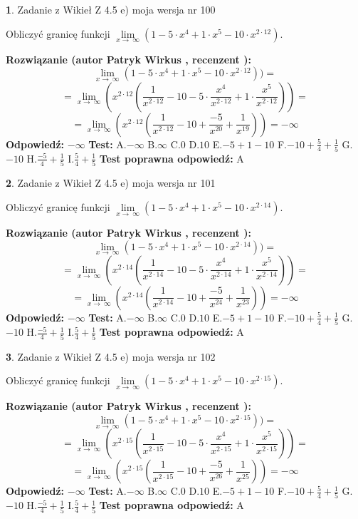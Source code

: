 \documentclass[12pt, a4paper]{article}
\theoremstyle{definition} %
\newtheorem{zad}{}
\newcommand{\zadStart}[1]{\begin{zad}#1\newline}
\newcommand{\zadStop}{\end{zad}}
\newcommand{\rozwStart}[2]{\noindent \textbf{Rozwiązanie (autor #1 , recenzent #2): }\newline}
\newcommand{\rozwStop}{\newline}
\newcommand{\odpStart}{\noindent \textbf{Odpowiedź:}\newline}
\newcommand{\odpStop}{\newline}
\newcommand{\testStart}{\noindent \textbf{Test:}\newline}
\newcommand{\testStop}{\newline}
\newcommand{\kluczStart}{\noindent \textbf{Test poprawna odpowiedź:}\newline}
\newcommand{\kluczStop}{\newline}
\begin{document}
\zadStart{Zadanie z Wikieł Z 4.5 e) moja wersja nr 100}



Obliczyć granicę funkcji  $\lim\limits_{x\to\ \infty}(1 - 5 \cdot x^{4}+1 \cdot x^{5}- 10 \cdot x^{2\cdot12})$.
\zadStop
\rozwStart{Patryk Wirkus}{}
$$\lim\limits_{x\to\ \infty}(1 - 5 \cdot x^{4}+1 \cdot x^{5}- 10 \cdot x^{2\cdot12}))=$$
$$=\lim\limits_{x\to\ \infty}(x^{2\cdot12}(\frac{1}{x^{2\cdot12}}-10 -5 \cdot \frac{x^{4}}{x^{2\cdot12}}+1 \cdot \frac{x^{5}}{x^{2\cdot12}}))=$$
$$=\lim\limits_{x\to\ \infty}(x^{2\cdot12}(\frac{1}{x^{2\cdot12}}-10 + \frac{-5}{x^{20}}+ \frac{1}{x^{19}}))=-\infty$$
\rozwStop
\odpStart
$-\infty$
\odpStop
\testStart
A.$-\infty$ B.$\infty$ C.$0$ D.$10$ E.$-5 + 1 - 10$
F.$-10+\frac{5}{4}+\frac{1}{5}$ G.$-10$
H.$\frac{-5}{4}+\frac{1}{5}$
I.$\frac{5}{4}+\frac{1}{5}$
\testStop
\kluczStart
A
\kluczStop



\zadStart{Zadanie z Wikieł Z 4.5 e) moja wersja nr 101}



Obliczyć granicę funkcji  $\lim\limits_{x\to\ \infty}(1 - 5 \cdot x^{4}+1 \cdot x^{5}- 10 \cdot x^{2\cdot14})$.
\zadStop
\rozwStart{Patryk Wirkus}{}
$$\lim\limits_{x\to\ \infty}(1 - 5 \cdot x^{4}+1 \cdot x^{5}- 10 \cdot x^{2\cdot14}))=$$
$$=\lim\limits_{x\to\ \infty}(x^{2\cdot14}(\frac{1}{x^{2\cdot14}}-10 -5 \cdot \frac{x^{4}}{x^{2\cdot14}}+1 \cdot \frac{x^{5}}{x^{2\cdot14}}))=$$
$$=\lim\limits_{x\to\ \infty}(x^{2\cdot14}(\frac{1}{x^{2\cdot14}}-10 + \frac{-5}{x^{24}}+ \frac{1}{x^{23}}))=-\infty$$
\rozwStop
\odpStart
$-\infty$
\odpStop
\testStart
A.$-\infty$ B.$\infty$ C.$0$ D.$10$ E.$-5 + 1 - 10$
F.$-10+\frac{5}{4}+\frac{1}{5}$ G.$-10$
H.$\frac{-5}{4}+\frac{1}{5}$
I.$\frac{5}{4}+\frac{1}{5}$
\testStop
\kluczStart
A
\kluczStop



\zadStart{Zadanie z Wikieł Z 4.5 e) moja wersja nr 102}



Obliczyć granicę funkcji  $\lim\limits_{x\to\ \infty}(1 - 5 \cdot x^{4}+1 \cdot x^{5}- 10 \cdot x^{2\cdot15})$.
\zadStop
\rozwStart{Patryk Wirkus}{}
$$\lim\limits_{x\to\ \infty}(1 - 5 \cdot x^{4}+1 \cdot x^{5}- 10 \cdot x^{2\cdot15}))=$$
$$=\lim\limits_{x\to\ \infty}(x^{2\cdot15}(\frac{1}{x^{2\cdot15}}-10 -5 \cdot \frac{x^{4}}{x^{2\cdot15}}+1 \cdot \frac{x^{5}}{x^{2\cdot15}}))=$$
$$=\lim\limits_{x\to\ \infty}(x^{2\cdot15}(\frac{1}{x^{2\cdot15}}-10 + \frac{-5}{x^{26}}+ \frac{1}{x^{25}}))=-\infty$$
\rozwStop
\odpStart
$-\infty$
\odpStop
\testStart
A.$-\infty$ B.$\infty$ C.$0$ D.$10$ E.$-5 + 1 - 10$
F.$-10+\frac{5}{4}+\frac{1}{5}$ G.$-10$
H.$\frac{-5}{4}+\frac{1}{5}$
I.$\frac{5}{4}+\frac{1}{5}$
\testStop
\kluczStart
A
\kluczStop
\end{document}
